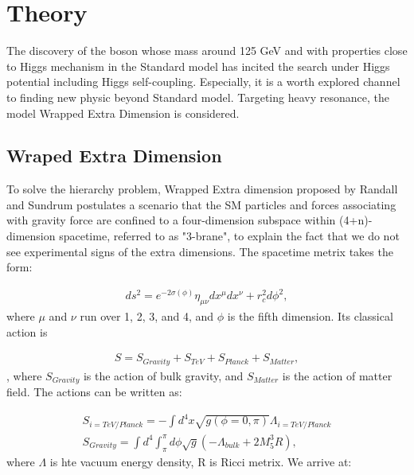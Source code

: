 \section{Theory}

The discovery of the boson whose mass around 125 GeV and with properties close to Higgs mechanism in the Standard model has incited the search under Higgs potential including Higgs self-coupling\citep{jetarea_fastjet_pu,HiggsdiscoveryAtlas}. Especially, it is a worth explored channel to finding new physic beyond Standard model. 
Targeting heavy resonance, the model Wrapped Extra Dimension is considered. 

\subsection{Wraped Extra Dimension} 

To solve the hierarchy problem, Wrapped Extra dimension proposed by Randall and Sundrum postulates a scenario that the SM particles and forces associating with gravity force are confined to a four-dimension subspace within (4+n)-dimension spacetime, referred to as "3-brane", 
to explain the fact that we do not see experimental signs of the extra dimensions\citep{Randall:1999ee}.  The spacetime metrix takes the form\citep{Oliveira:2014kla}:

\begin{equation} \label{eq1}
\begin{split}
ds^2 = e^{-2\sigma(\phi)}\eta_{\mu\nu}dx^{\mu}dx^{\nu} + r^2_{c}d\phi^2, 
\end{split}
\end{equation}
where $\mu$ and $\nu$ run over 1, 2, 3, and 4, and $\phi$ is the fifth dimension. Its classical action is 

\begin{equation} \label{eq1}
\begin{split}
S = S_{Gravity}+S_{TeV}+S_{Planck}+S_{Matter},
\end{split}
\end{equation},
where $S_{Gravity}$ is the action of bulk gravity, and $S_{Matter}$ is the action of matter field. The actions can be written as:

\begin{equation} \label{eq1}
\begin{split}
S_{i=TeV/Planck}=-\int d^4x \sqrt{g(\phi =0,\pi)}\Lambda_{i=TeV/Planck}\\
S_{Gravity}=\int d^4 \int ^{\pi}_{\pi} d\phi \sqrt{g}(-\Lambda_{bulk}+2M^3_{5}R),
\end{split}
\end{equation}
where $\Lambda$ is hte vacuum energy density, R is Ricci metrix. We arrive at:


